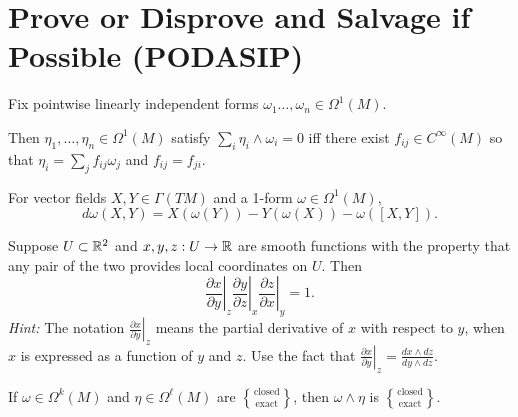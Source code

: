 \documentclass{homework}
\begin{document}
\section{Prove or Disprove and Salvage if Possible (PODASIP)}

\begin{problem} Fix pointwise linearly independent forms $\omega_1
\ldots, \omega_n \in \Omega^1(M)$.

  Then $\eta_1, \ldots, \eta_n \in \Omega^1(M)$ satisfy $\sum_i \eta_i \wedge \omega_i = 0$ iff there exist $f_{ij} \in C^\infty(M)$ so that $\eta_i = \sum_j f_{ij} \omega_j$ and $f_{ij} = f_{ji}$.
\end{problem}

\begin{problem} For vector fields $X, Y \in \Gamma(TM)$ and a 1-form
$\omega \in \Omega^1(M)$,
\[
  d\omega(X,Y) = X(\omega (Y)) - Y(\omega(X)) - \omega([X,Y]).
\]
\end{problem}

\begin{problem} Suppose $U \subset \mathbb{R}^2$ and $x,y,z: U \to \mathbb{R}$ are
smooth functions with the property that any pair of the two provides
local coordinates on $U$.  Then
  \[
    \left. \frac{\partial x}{\partial y} \right|_{z} 
    \left. \frac{\partial y}{\partial z} \right|_{x} 
    \left. \frac{\partial z}{\partial x} \right|_{y} = 1. %
  \] \textit{Hint:} The notation $\left. \frac{\partial x}{\partial y}
\right|_{z}$ means the partial derivative of $x$ with respect to $y$,
when $x$ is expressed as a function of $y$ and $z$.  Use the fact that
$\left. \frac{\partial x}{\partial y} \right|_{z} = \frac{dx \wedge
dz}{dy \wedge dz}$.
\end{problem}

\newcommand{\respectively}[2]{$\genfrac\{\}{0pt}{0}{\mbox{#1}}{\mbox{#2}}$}

\begin{problem}\label{closed-wedge-closed}If $\omega \in \Omega^k(M)$ and $\eta \in
\Omega^{\ell}(M)$ are \respectively{closed}{exact}, then $\omega
\wedge \eta$ is \respectively{closed}{exact}.
\end{problem}
\end{document}
